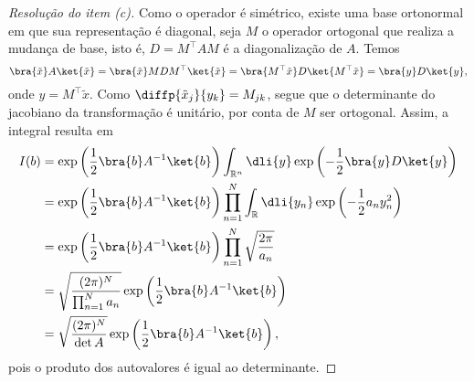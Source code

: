 \begin{proof}[Resolução do item (c)]
    Como o operador é simétrico, existe uma base ortonormal em que sua representação é diagonal, seja \(M\) o operador ortogonal que realiza a mudança de base, isto é, \(D = M^{\top}AM\) é a diagonalização de \(A\). Temos
    \begin{equation*}
        \bra{\tilde{x}}A\ket{\tilde{x}} = \bra{\tilde{x}}MDM^{\top}\ket{\tilde{x}} = \bra{M^\top\tilde{x}}D\ket{M^\top\tilde{x}} = \bra{y}D\ket{y},
    \end{equation*}
    onde \(y = M^\top \tilde{x}\). Como \(\diffp{\tilde{x}_j}{y_k} = M_{jk}\), segue que o determinante do jacobiano da transformação é unitário, por conta de \(M\) ser ortogonal. Assim, a integral resulta em
    \begin{align*}
        I(b) &= \exp\left(\frac12 \bra{b}A^{-1}\ket{b}\right)\int_{\mathbb{R}^n} \dli{y} \exp\left(-\frac12 \bra{y}D\ket{y}\right)\\
             &= \exp\left(\frac12 \bra{b}A^{-1}\ket{b}\right)\prod_{n=1}^N\int_{\mathbb{R}} \dli{y_n} \exp\left(-\frac12 a_n y_n^2\right)\\
             &= \exp\left(\frac12 \bra{b}A^{-1}\ket{b}\right)\prod_{n=1}^N \sqrt{\frac{2\pi}{a_n}}\\
             &= \sqrt{\frac{(2\pi)^N}{\prod_{n=1}^Na_n}}\exp\left(\frac12 \bra{b}A^{-1}\ket{b}\right)\\
             &= \sqrt{\frac{(2\pi)^N}{\det A}}\exp\left(\frac12 \bra{b}A^{-1}\ket{b}\right),
    \end{align*}
    pois o produto dos autovalores é igual ao determinante.
\end{proof}
